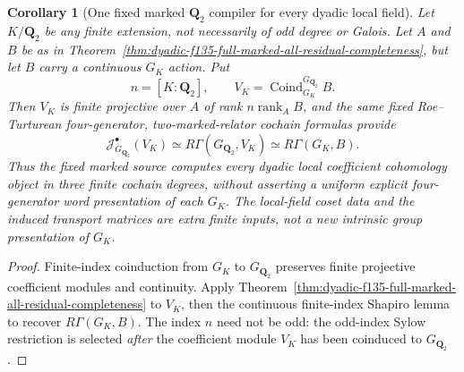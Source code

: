 \documentclass[11pt]{article}
\newtheorem{corollary}[theorem]{Corollary}
\theoremstyle{definition}
\begin{document}
\begin{corollary}[One fixed marked $\mathbf Q_2$ compiler for every dyadic local field]
\label{cor:dyadic-f135-all-finite-extensions-coinduced}
Let $K/\mathbf Q_2$
be \emph{any} finite
extension, not
necessarily of odd
degree or Galois.
Let $A$ and
$B$ be as in
Theorem~\ref{thm:dyadic-f135-full-marked-all-residual-completeness},
but let $B$ carry a
continuous $G_K$
action.
Put
\[
n=[K:\mathbf Q_2],
\qquad
V_K=\operatorname{Coind}_{G_K}^{G_{\mathbf Q_2}}B.
\]
Then $V_K$
is finite projective
over $A$ of rank
$n\operatorname{rank}_A B$,
and the same fixed
Roe--Turturean
four-generator,
two-marked-relator
cochain formulas
provide
\begin{equation}\label{eq:dyadic-f135-all-k-via-q2-marked}
\boxed{\quad
\mathcal J_{G_{\mathbf Q_2}}^\bullet(V_K)
\simeq
R\Gamma(G_{\mathbf Q_2},V_K)
\simeq
R\Gamma(G_K,B).
\quad}
\end{equation}
Thus the fixed
marked source
computes \emph{every}
dyadic local
coefficient cohomology
object in three
finite cochain
degrees, without
asserting a
uniform explicit
four-generator
word presentation
of each
$G_K$.
The local-field
coset data and
the induced
transport matrices
are extra finite
inputs, not a
new intrinsic
group presentation
of $G_K$.
\end{corollary}

\begin{proof}
Finite-index
coinduction from
$G_K$ to
$G_{\mathbf Q_2}$
preserves finite
projective
coefficient modules
and continuity.
Apply
Theorem~\ref{thm:dyadic-f135-full-marked-all-residual-completeness}
to $V_K$,
then the
continuous
finite-index
Shapiro lemma
to recover
$R\Gamma(G_K,B)$.
The index
$n$ need
not be odd:
the odd-index
Sylow restriction
is selected
\emph{after}
the coefficient
module $V_K$
has been
coinduced to
$G_{\mathbf Q_2}$.
\end{proof}
\end{document}
